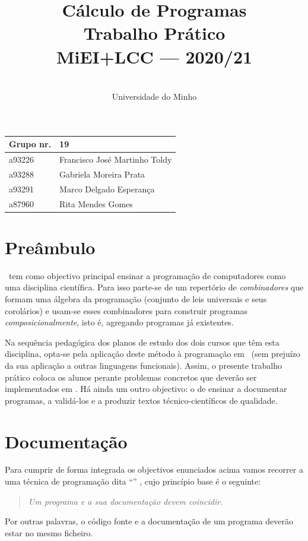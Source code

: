\documentclass[a4paper]{article}
\title{
       	Cálculo de Programas
\\
       	Trabalho Prático
\\
       	MiEI+LCC --- 2020/21
}
\author{
       	\dium
\\
       	Universidade do Minho
}
\date\mydate
\begin{document}
\maketitle

\begin{center}\large
\begin{tabular}{ll}
\textbf{Grupo} nr. & 19 
\\\hline
a93226 & Francisco José Martinho Toldy
\\
a93288 & Gabriela Moreira Prata
\\
a93291 & Marco Delgado Esperança	
\\
a87960 & Rita Mendes Gomes
\end{tabular}
\end{center}

\section{Preâmbulo}

\CP\ tem como objectivo principal ensinar
a progra\-mação de computadores como uma disciplina científica. Para isso
parte-se de um repertório de \emph{combinadores} que formam uma álgebra da
programação (conjunto de leis universais e seus corolários) e usam-se esses
combinadores para construir programas \emph{composicionalmente}, isto é,
agregando programas já existentes.
  
Na sequência pedagógica dos planos de estudo dos dois cursos que têm
esta disciplina, opta-se pela aplicação deste método à programação
em \Haskell\ (sem prejuízo da sua aplicação a outras linguagens 
funcionais). Assim, o presente trabalho prático coloca os
alunos perante problemas concretos que deverão ser implementados em
\Haskell.  Há ainda um outro objectivo: o de ensinar a documentar
programas, a validá-los e a produzir textos técnico-científicos de
qualidade.

\section{Documentação} Para cumprir de forma integrada os objectivos
enunciados acima vamos recorrer a uma técnica de programa\-ção dita
``'' \cite{Kn92}, cujo princípio base é o seguinte:
%
\begin{quote}\em Um programa e a sua documentação devem coincidir.
\end{quote}
%
Por outras palavras, o código fonte e a documentação de um
programa deverão estar no mesmo ficheiro.
\end{document}
